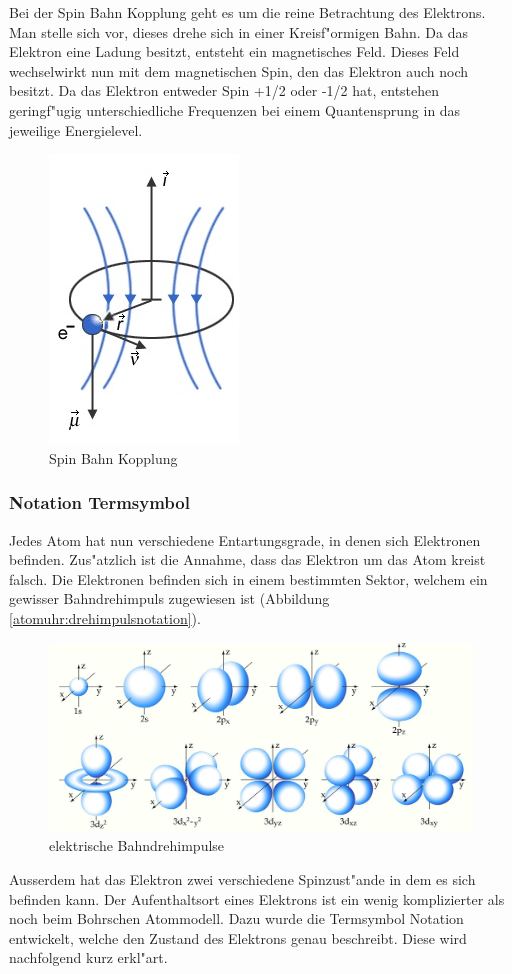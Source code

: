 \begin{refsection}
Bei der Spin Bahn Kopplung geht es um die reine Betrachtung des
Elektrons. Man stelle sich vor, dieses drehe sich in einer Kreisf"ormigen Bahn.  Da das
Elektron eine Ladung besitzt, entsteht ein magnetisches Feld.  Dieses
Feld wechselwirkt nun mit dem magnetischen Spin, den das Elektron auch
noch besitzt.  Da das Elektron entweder Spin +1/2 oder -1/2 hat,
entstehen geringf"ugig unterschiedliche Frequenzen bei einem
Quantensprung in das jeweilige Energielevel.

\begin{figure}
	\centering
	\includegraphics[width=.2\columnwidth]{../vortrag/pictures/feinstrukturelektron.jpg}
	\caption{Spin Bahn Kopplung} %
	\label{atomuhr:spinbahn}
\end{figure}

\subsubsection{Notation Termsymbol}
Jedes Atom hat nun verschiedene Entartungsgrade, in denen sich
Elektronen befinden. Zus"atzlich ist die Annahme, dass das Elektron um
das Atom kreist falsch. Die Elektronen befinden sich in einem
bestimmten Sektor, welchem ein gewisser Bahndrehimpuls zugewiesen ist (Abbildung \ref{atomuhr:drehimpulsnotation}).
\begin{figure}
	\centering
	\includegraphics[width = 0.8\columnwidth]{../vortrag/pictures/orbitale.JPG}
	\caption{elektrische Bahndrehimpulse} %
	\label{atomuhr:bahndrehimpuls}
\end{figure}
Ausserdem hat das Elektron zwei verschiedene Spinzust"ande in dem es
sich befinden kann. Der Aufenthaltsort eines Elektrons ist ein wenig
komplizierter als noch beim Bohrschen Atommodell.  Dazu wurde die
Termsymbol Notation entwickelt, welche den Zustand des Elektrons genau
beschreibt.  Diese wird nachfolgend kurz erkl"art.


\end{refsection}
